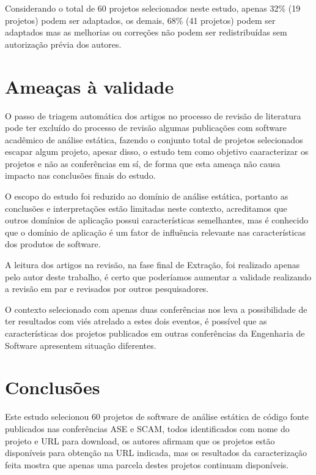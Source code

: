 Considerando o total de 60 projetos selecionados neste estudo, apenas 32\% (19
projetos) podem ser adaptados, os demais, 68\% (41 projetos) podem ser
adaptados mas as melhorias ou correções não podem ser redistribuídas sem
autorização prévia dos autores.

\section{Ameaças à validade}

O passo de triagem automática dos artigos no processo de revisão de literatura
pode ter excluído do processo de revisão algumas publicações com software
acadêmico de análise estática, fazendo o conjunto total de projetos
selecionados escapar algum projeto, apesar disso, o estudo tem como objetivo
caaracterizar os projetos e não as conferências em sí, de forma que esta ameaça
não causa impacto nas conclusões finais do estudo.

O escopo do estudo foi reduzido ao domínio de análise estática, portanto as
conclusões e interpretações estão limitadas neste contexto, acreditamos que
outros domínios de aplicação possui características semelhantes, mas é
conhecido que o domínio de aplicação é um fator de influência relevante nas
características dos produtos de software.

A leitura dos artigos na revisão, na fase final de Extração, foi realizado
apenas pelo autor deste trabalho, é certo que poderíamos aumentar a validade
realizando a revisão em par e revisados por outros pesquisadores.

O contexto selecionado com apenas duas conferências nos leva a possibilidade de
ter resultados com viés atrelado a estes dois eventos, é possível que as
características dos projetos publicados em outras conferências da Engenharia de
Software apresentem situação diferentes.

\section{Conclusões} \label{estudo1:conclusoes}

Este estudo selecionou 60 projetos de software de análise estática de código
fonte publicados nas conferências ASE e SCAM, todos identificados com nome do
projeto e URL para download, os autores afirmam que os projetos estão
disponíveis para obtenção na URL indicada, mas os resultados da caracterização
feita mostra que apenas uma parcela destes projetos continuam disponíveis.

